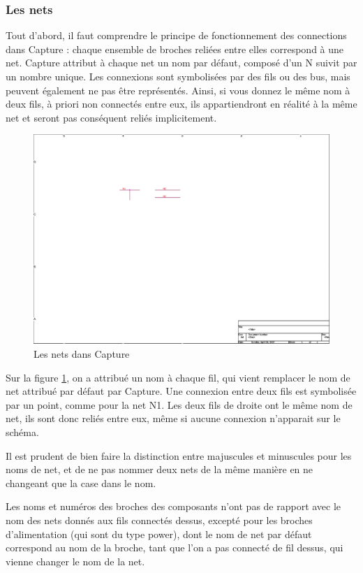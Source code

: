 \documentclass[a4paper]{article}
\begin{document}
\subsubsection{Les nets}

Tout d'abord, il faut comprendre le principe de fonctionnement des connections dans Capture : chaque ensemble de broches reliées entre elles correspond à une net. Capture attribut à chaque net un nom par défaut, composé d'un \og{}N\fg{} suivit par un nombre unique. Les connexions sont symbolisées par des fils ou des bus, mais peuvent également ne pas être représentés. Ainsi, si vous donnez le même nom à deux fils, à priori non connectés entre eux, ils appartiendront en réalité à la même net et seront pas conséquent reliés implicitement.

\begin{figure}[H]
	\centering
	\includegraphics[scale=1.00]{Images/Les_nets_OrCAD}
	\caption{Les nets dans Capture
		\label{Les_nets_OrCAD}}
\end{figure}

Sur la figure \ref{Les_nets_OrCAD}, on a attribué un nom à chaque fil, qui vient remplacer le nom de net attribué par défaut par Capture. Une connexion entre deux fils est symbolisée par un point, comme pour la net N1. Les deux fils de droite ont le même nom de net, ils sont donc reliés entre eux, même si aucune connexion n'apparait sur le schéma.

Il est prudent de bien faire la distinction entre majuscules et minuscules pour les noms de net, et de ne pas nommer deux nets de la même manière en ne changeant que la case dans le nom.

Les noms et numéros des broches des composants n'ont pas de rapport avec le nom des nets donnés aux fils connectés dessus, excepté pour les broches d'alimentation (qui sont du type \og{}power\fg{}), dont le nom de net par défaut correspond au nom de la broche, tant que l'on a pas connecté de fil dessus, qui vienne changer le nom de la net.
\end{document}
